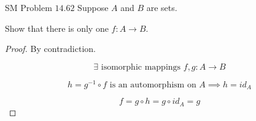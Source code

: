 \begin{frame}{}
  \begin{exampleblock}{SM Problem $14.62$}
    Suppose $A$ and $B$ are   sets. 
    
    Show that there is only one  $f : A \to B$.
  \end{exampleblock}

  \vspace{0.50cm}
  \begin{proof}
    \pause
    \centerline{By contradiction.}

    \pause
    \[
      \exists \text{ isomorphic mappings } f, g: A \to B
    \]

    \pause
    \[
      h = g^{-1} \circ f \text{ is an automorphism on } A \implies h = id_A
    \]

    \pause
    \[
      f = g \circ h = g \circ id_A = g
    \]
  \end{proof}
\end{frame}
